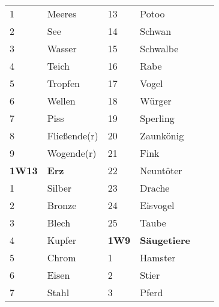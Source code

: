 \documentclass[final]{multiversum}
\begin{document}
\begin{table*}[!t]
\begin{framed}
\begin{tabular}{p{}p{}p{}p{}p{}p{}}
1             & Meeres                         & 13              & Potoo                                       \\
2             & See                            & 14              & Schwan                                      \\
3             & Wasser                         & 15              & Schwalbe                                    \\
4             & Teich                          & 16              & Rabe                                        \\
5             & Tropfen                        & 17              & Vogel                                       \\
6             & Wellen                         & 18              & Würger                                      \\
7             & Piss                           & 19              & Sperling                                    \\
8             & Flie{\ss}ende(r)               & 20              & Zaunkönig                                   \\
9             & Wogende(r)                     & 21              & Fink                                        \\
\textbf{1W13} & \textbf{Erz}                   & 22              & Neuntöter                                   \\
1             & Silber                         & 23              & Drache                                      \\
2             & Bronze                         & 24              & Eisvogel                                    \\
3             & Blech                          & 25              & Taube                                       \\
4             & Kupfer                         & \textbf{1W9}    & \textbf{Säugetiere}                         \\
5             & Chrom             	           & 1               & Hamster                                     \\
6             & Eisen                          & 2               & Stier                                       \\
7             & Stahl                          & 3               & Pferd                                       \\

\end{tabular}
\end{framed}
\end{table*}
\end{document}
